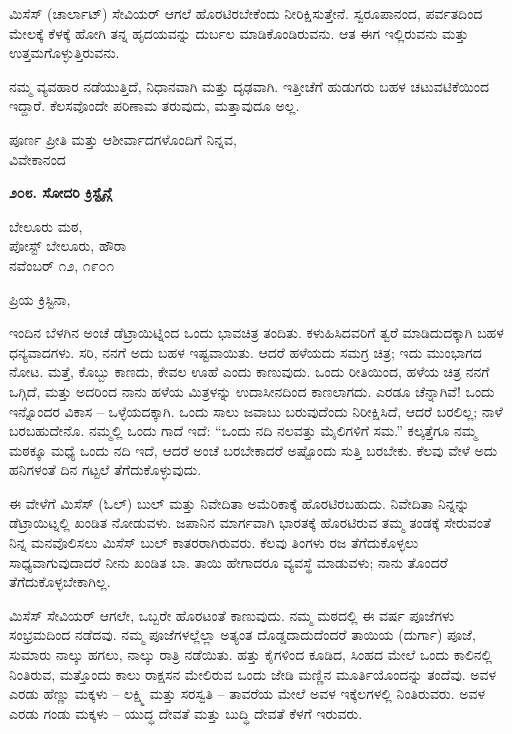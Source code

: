 ಮಿಸೆಸ್ (ಚಾರ್ಲಾಟ್) ಸೇವಿಯರ್ ಆಗಲೆ ಹೊರಟಿರಬೇಕೆಂದು ನೀರಿಕ್ಷಿಸುತ್ತೇನೆ. ಸ್ವರೂಪಾನಂದ, ಪರ್ವತದಿಂದ ಮೇಲಕ್ಕೆ ಕೆಳಕ್ಕೆ ಹೋಗಿ ತನ್ನ ಹೃದಯವನ್ನು ದುರ್ಬಲ ಮಾಡಿಕೊಂಡಿರುವನು. ಆತ ಈಗ ಇಲ್ಲಿರುವನು ಮತ್ತು ಉತ್ತಮಗೊಳ್ಳುತ್ತಿರುವನು.

ನಮ್ಮ ವ್ಯವಹಾರ ನಡೆಯುತ್ತಿದೆ, ನಿಧಾನವಾಗಿ ಮತ್ತು ದೃಢವಾಗಿ. ಇತ್ತೀಚೆಗೆ ಹುಡುಗರು ಬಹಳ ಚಟುವಟಿಕೆಯಿಂದ ಇದ್ದಾರೆ. ಕೆಲಸವೊಂದೇ ಪರಿಣಾಮ ತರುವುದು, ಮತ್ತಾವುದೂ ಅಲ್ಲ.

\begin{flushright}
ಪೂರ್ಣ ಪ್ರೀತಿ ಮತ್ತು ಆಶೀರ್ವಾದಗಳೊಂದಿಗೆ ನಿನ್ನವ,\\ವಿವೇಕಾನಂದ
\end{flushright}

\begin{center}
\textbf{೨೦೮. ಸೋದರಿ ಕ್ರಿಸ್ಟೈನ್ಗೆ}
\end{center}

\begin{flushright}
ಬೇಲೂರು ಮಠ,\\ಪೋಸ್ಟ್ ಬೇಲೂರು, ಹೌರಾ\\ನವೆಂಬರ್ ೧೨, ೧೯೦೧
\end{flushright}

ಪ್ರಿಯ ಕ್ರಿಸ್ಟಿನಾ,

ಇಂದಿನ ಬೆಳಗಿನ ಅಂಚೆ ಡೆಟ್ರಾಯಿಟ್ನಿಂದ ಒಂದು ಭಾವಚಿತ್ರ ತಂದಿತು. ಕಳುಹಿಸಿದವರಿಗೆ ತ್ವರೆ ಮಾಡಿದುದಕ್ಕಾಗಿ ಬಹಳ ಧನ್ಯವಾದಗಳು. ಸರಿ, ನನಗೆ ಅದು ಬಹಳ ಇಷ್ಟವಾಯಿತು. ಆದರೆ ಹಳೆಯದು ಸಮಗ್ರ ಚಿತ್ರ; ಇದು ಮುಂಭಾಗದ ನೋಟ. ಮತ್ತೆ, ಕೊಬ್ಬು ಕಾಣದು, ಕೇವಲ ಊಹೆ ಎಂದು ಕಾಣುವುದು. ಒಂದು ರೀತಿಯಿಂದ, ಹಳೆಯ ಚಿತ್ರ ನನಗೆ ಒಗ್ಗಿದೆ, ಮತ್ತು ಅದರಿಂದ ನಾನು ಹಳೆಯ ಮಿತ್ರಳನ್ನು ಉದಾಸೀನದಿಂದ ಕಾಣಲಾಗದು. ಎರಡೂ ಚೆನ್ನಾಗಿವೆ! ಒಂದು ಇನ್ನೊಂದರ ವಿಕಾಸ – ಒಳ್ಳೆಯದಕ್ಕಾಗಿ. ಒಂದು ಸಾಲು ಜವಾಬು ಬರುವುದೆಂದು ನಿರೀಕ್ಷಿಸಿದೆ, ಆದರೆ ಬರಲಿಲ್ಲ; ನಾಳೆ ಬರಬಹುದೇನೊ. ನಮ್ಮಲ್ಲಿ ಒಂದು ಗಾದೆ ಇದೆ: “ಒಂದು ನದಿ ನಲವತ್ತು ಮೈಲಿಗಳಿಗೆ ಸಮ.” ಕಲ್ಕತ್ತೆಗೂ ನಮ್ಮ ಮಠಕ್ಕೂ ಮಧ್ಯೆ ಒಂದು ನದಿ ಇದೆ, ಆದರೆ ಅಂಚೆ ಬರಬೇಕಾದರೆ ಅಷ್ಟೊಂದು ಸುತ್ತಿ ಬರಬೇಕು. ಕೆಲವು ವೇಳೆ ಅದು ಹನಿಗಳಂತೆ ದಿನ ಗಟ್ಟಲೆ ತೆಗೆದುಕೊಳ್ಳುವುದು.

ಈ ವೇಳೆಗೆ ಮಿಸೆಸ್ (ಓಲ್) ಬುಲ್ ಮತ್ತು ನಿವೇದಿತಾ ಅಮೆರಿಕಾಕ್ಕೆ ಹೊರಟಿರಬಹುದು. ನಿವೇದಿತಾ ನಿನ್ನನ್ನು ಡೆಟ್ರಾಯಿಟ್ನಲ್ಲಿ ಖಂಡಿತ ನೋಡುವಳು. ಜಪಾನಿನ ಮಾರ್ಗವಾಗಿ ಭಾರತಕ್ಕೆ ಹೊರಟಿರುವ ತಮ್ಮ ತಂಡಕ್ಕೆ ಸೇರುವಂತೆ ನಿನ್ನ ಮನವೊಲಿಸಲು ಮಿಸೆಸ್ ಬುಲ್ ಕಾತರರಾಗಿರುವರು. ಕೆಲವು ತಿಂಗಳು ರಜ ತೆಗೆದುಕೊಳ್ಳಲು ಸಾಧ್ಯವಾಗುವುದಾದರೆ ನೀನು ಖಂಡಿತ ಬಾ. ತಾಯಿ ಹೇಗಾದರೂ ವ್ಯವಸ್ಥೆ ಮಾಡುವಳು; ನಾನು ತೊಂದರೆ ತೆಗೆದುಕೊಳ್ಳಬೇಕಾಗಿಲ್ಲ.

ಮಿಸೆಸ್ ಸೇವಿಯರ್ ಆಗಲೇ, ಒಬ್ಬರೇ ಹೊರಟಂತೆ ಕಾಣುವುದು. ನಮ್ಮ ಮಠದಲ್ಲಿ ಈ ವರ್ಷ ಪೂಜೆಗಳು ಸಂಭ್ರಮದಿಂದ ನಡೆದವು. ನಮ್ಮ ಪೂಜೆಗಳಲ್ಲೆಲ್ಲಾ ಅತ್ಯಂತ ದೊಡ್ಡದಾದುದೆಂದರೆ ತಾಯಿಯ (ದುರ್ಗಾ) ಪೂಜೆ, ಸುಮಾರು ನಾಲ್ಕು ಹಗಲು, ನಾಲ್ಕು ರಾತ್ರಿ ನಡೆಯಿತು. ಹತ್ತು ಕೈಗಳಿಂದ ಕೂಡಿದ, ಸಿಂಹದ ಮೇಲೆ ಒಂದು ಕಾಲಿನಲ್ಲಿ ನಿಂತಿರುವ, ಮತ್ತೊಂದು ಕಾಲು ರಾಕ್ಷಸನ ಮೇಲಿರುವ ಒಂದು ಜೇಡಿ ಮಣ್ಣಿನ ಮೂರ್ತಿಯೊಂದನ್ನು ತಂದೆವು. ಅವಳ ಎರಡು ಹೆಣ್ಣು ಮಕ್ಕಳು – ಲಕ್ಷ್ಮಿ ಮತ್ತು ಸರಸ್ವತಿ – ತಾವರೆಯ ಮೇಲೆ ಅವಳ ಇಕ್ಕೆಲಗಳಲ್ಲಿ ನಿಂತಿರುವರು. ಅವಳ ಎರಡು ಗಂಡು ಮಕ್ಕಳು – ಯುದ್ಧ ದೇವತೆ ಮತ್ತು ಬುದ್ಧಿ ದೇವತೆ ಕೆಳಗೆ ಇರುವರು.

